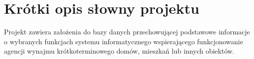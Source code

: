 \section{Krótki opis słowny projektu}
Projekt zawiera założenia do bazy danych przechowującej podstawowe informacje o wybranych funkcjach systemu informatycznego wspierającego funkcjonowanie agencji wynajmu krótkoterminowego domów, mieszkań lub innych obiektów.